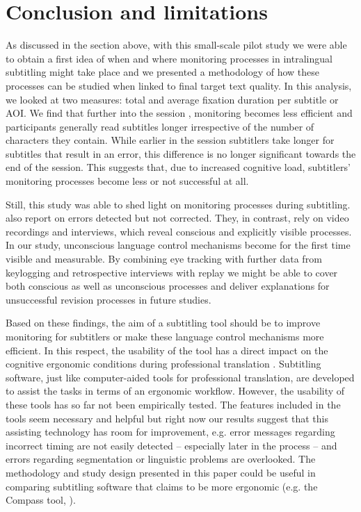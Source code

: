 \documentclass[output=paper]{langscibook}
\begin{document}
\section{Conclusion and limitations}
As discussed in the section above, with this small-scale pilot study we were able to obtain a first idea of when and where monitoring processes in intralingual subtitling might take place and we presented a methodology of how these processes can be studied when linked to final target text quality.
In this analysis, we looked at two measures: total and average fixation duration per subtitle or AOI.
We find that further into the session , monitoring becomes less efficient and participants generally read subtitles longer irrespective of the number of characters they contain.
While earlier in the session subtitlers take longer for subtitles that result in an error, this difference is no longer significant towards the end of the session.
This suggests that, due to increased cognitive load, subtitlers' monitoring processes become less or not successful at all.

Still, this study was able to shed light on monitoring processes during subtitling.
\citet{ipsen-dam2016} also report on errors detected but not corrected.
They, in contrast, rely on video recordings and interviews, which reveal conscious and explicitly visible processes.
In our study, unconscious language control mechanisms become for the first time visible and measurable.
By combining eye tracking with further data from keylogging and retrospective interviews with replay we might be able to cover both conscious as well as unconscious processes and deliver explanations for unsuccessful revision processes in future studies.

Based on these findings, the aim of a subtitling tool should be to improve monitoring for subtitlers or make these language control mechanisms more efficient.
In this respect, the usability of the tool has a direct impact on the cognitive ergonomic conditions during professional translation \citep{ehrensberger2014cognitive}.
Subtitling software, just like computer-aided tools for professional translation, are developed to assist the tasks in terms of an ergonomic workflow.
However, the usability of these tools has so far not been empirically tested.
The  features included in the tools seem necessary and helpful but right now our results suggest that this assisting technology has room for improvement, e.g.
error messages regarding incorrect timing are not easily detected -- especially later in the process -- and errors regarding segmentation or linguistic problems are overlooked.
The methodology and study design presented in this paper could be useful in comparing subtitling software that claims to be more ergonomic (e.g. the Compass tool, \citealt{hansen-schirra-etal2019}).
\end{document}
